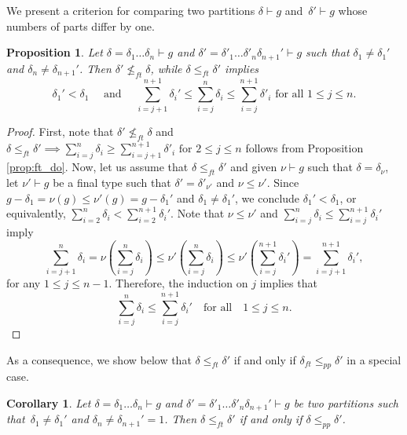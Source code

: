 \documentclass[11pt]{amsart}
\numberwithin{equation}{section}
\theoremstyle{plain}
\newcommand{\<}{\left \langle}
\renewcommand{\>}{\right \rangle}
\newtheorem{prop}[thm]{Proposition}
\newtheorem{cor}[thm]{Corollary}
\theoremstyle{definition}
\theoremstyle{remark}
\begin{document}
We present a criterion for comparing two partitions $\delta\vdash g$ and~$\delta' \vdash g$ whose numbers of parts differ by one.


\begin{prop}
Let $\delta = \delta_1\ldots\delta_n \vdash g$ and $\delta' = \delta'_1\ldots\delta'_n\delta_{n+1}'\vdash g$ such that $\delta_1 \neq \delta_1'$ and $\delta_{n}\neq \delta_{n+1}'$. Then ${\delta'}\not\leq_{ft} {\delta}$, while ${\delta}\leq_{ft} {\delta'}$ implies $$\delta_1' < \delta_1 \quad \text{ and } \quad \sum_{i = j + 1}^{n + 1}\delta_i' \leq  \sum_{i = j }^n\delta_i \leq \sum_{i = j}^{n + 1}\delta'_i \text{ for all }1 \leq j \leq n.$$  

\label{prop:comparingdeltas}
\end{prop}

\begin{proof}
First, note that ${\delta}' \not\leq_{ft} {\delta}$ and $\delta \leq_{ft} \delta' \implies \sum_{i = j}^n\delta_i \geq \sum_{i = j + 1}^{n + 1}\delta'_i \text{ for } 2 \leq j \leq n$ follows from Proposition \ref{prop:ft_do}.
Now, let us assume that ${\delta}\leq_{ft} {\delta'}$ and given $\nu \vdash g$ such that $\delta = \delta_{\nu}$, let $\nu' \vdash g$ be a final type such that $\delta' = \delta'_{\nu'}$ and $\nu \leq \nu'$. Since $g - \delta_1 = \nu(g)\leq \nu'(g) = g - \delta_1'$ and $\delta_1 \neq \delta_1'$, we conclude $\delta_1' < \delta_1$, or equivalently, $\sum_{i = 2}^{n}\delta_i < \sum_{i = 2}^{n+1}\delta_i'$. Note that $\nu \leq \nu'$ and $\sum_{i = j}^{n}\delta_i \leq \sum_{i = j}^{n +1}\delta_i'$ imply 
$$\sum_{i = j + 1}^{n}\delta_i = \nu(\sum_{i = j }^{n}\delta_i) \leq \nu'(\sum_{i = j}^{n}\delta_i) \leq \nu'(\sum_{i = j}^{n+1}\delta_i') = \sum_{i = j +1}^{n+1}\delta_i',$$ 
for any $1 \leq j \leq n-1$. 
Therefore, the induction on $j$ implies that
\begin{equation}
\sum_{i = j}^{n}\delta_i \leq \sum_{i = j}^{n +1}\delta_i' \quad \text{for all}\quad 1 \leq j \leq n.
\label{eqn:one_dir_ineq}    
\end{equation}
\end{proof}

As a consequence, we show below that ${\delta}\leq_{ft} {\delta}'$ if and only if $\delta_{ft} \leq_{pp} \delta'$ in a special case. 

\begin{cor}
Let $\delta = \delta_1\ldots\delta_n\vdash g$ and $\delta' = \delta'_1\ldots\delta'_n\delta_{n+1}'\vdash g$ be two partitions such that~$\delta_1 \neq \delta_1'$ and $\delta_n \neq \delta_{n+1}' = 1$. Then ${\delta}\leq_{ft} {\delta}'$ if and only if $\delta \leq_{pp} \delta'$. 
\label{cor:lastdeltaisone}
\end{cor}
\end{document}
